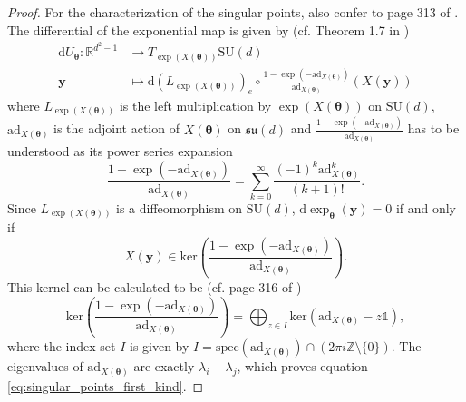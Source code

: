 \documentclass{article}
\renewcommand{\vec}[1]{\ensuremath{\boldsymbol{#1}}}
\begin{document}
\begin{proof}
    For the characterization of the singular points, also confer to page 313 of \cite{hilgert_structure_2012}.
    The differential of the exponential map is given by (cf. Theorem 1.7 in \cite{sigurdur_differential_1978})
    \begin{align}
    \label{eq:exp_jac}
        \mathrm{d}U_{\vec{\theta}}: \mathds{R}^{d^2-1} &\rightarrow T_{\exp(X(\vec{\theta}))} \mathrm{SU}(d) \nonumber \\
        \vec{y} & \mapsto \mathrm{d}\left(L_{\exp(X(\vec{\theta}))}\right)_e \circ \frac{1-\exp(-\mathrm{ad}_{X(\vec{\theta})})}{\mathrm{ad}_{X(\vec{\theta})}}( X(\vec{y}))
    \end{align}
    where \(L_{\exp(X(\vec{\theta}))}\) is the left multiplication by \(\exp(X(\vec{\theta}))\) on \(\mathrm{SU}(d)\), \(\mathrm{ad}_{X(\vec{\theta})}\) is the adjoint action of \(X(\vec{\theta})\) on \(\mathfrak{su}(d)\) and \(\frac{1-\exp(-\mathrm{ad}_{X(\vec{\theta})})}{\mathrm{ad}_{X(\vec{\theta})}}\) has to be understood as its power series expansion
    \begin{equation}
        \frac{1-\exp(-\mathrm{ad}_{X(\vec{\theta})})}{\mathrm{ad}_{X(\vec{\theta})}} = \sum_{k=0}^\infty \frac{(-1)^k \mathrm{ad}_{X(\vec{\theta})}^k}{(k+1)!}.
    \end{equation}
    Since \(L_{\exp(X(\vec{\theta}))}\) is a diffeomorphism on \(\mathrm{SU}(d)\), \(\mathrm{d}\exp_{\vec{\theta}}(\vec{y}) = 0\) if and only if
    \begin{equation}
        X(\vec{y}) \in \text{ker}\left(\frac{1-\exp(-\mathrm{ad}_{X(\vec{\theta})})}{\mathrm{ad}_{X(\vec{\theta})}}\right).
    \end{equation}
    This kernel can be calculated to be (cf. page 316 of \cite{hilgert_structure_2012})
    \begin{equation}
    \label{eq:kernel_exp_diff}
        \mathrm{ker}\left(\frac{1-\exp(-\mathrm{ad}_{X(\vec{\theta})})}{\mathrm{ad}_{X(\vec{\theta})}}\right) = \bigoplus_{z \in I} \mathrm{ker}(\mathrm{ad}_{X(\vec{\theta})} - z \mathds{1}),
    \end{equation}
    where the index set \(I\) is given by \(I = \mathrm{spec}(\mathrm{ad}_{X(\vec{\theta})}) \cap (2\pi i \mathds{Z} \setminus\{0\})\).
    The eigenvalues of \(\mathrm{ad}_{X(\vec{\theta})}\) are exactly \(\lambda_i - \lambda_j\), which proves equation \eqref{eq:singular_points_first_kind}.


\end{proof}
\end{document}
